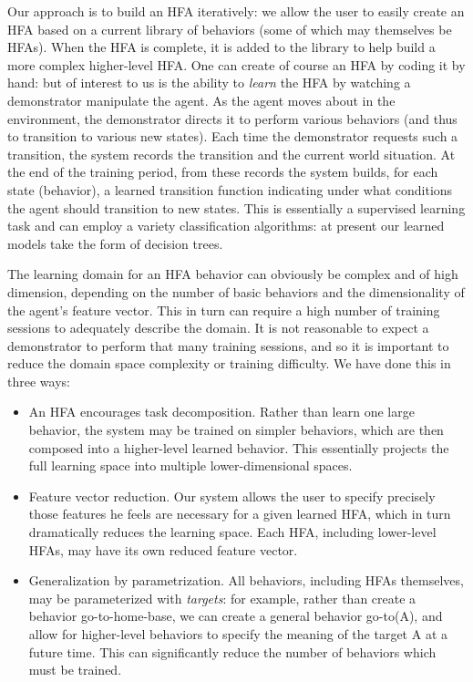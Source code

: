 \documentclass{aamas2010_cameraReady}
\begin{document}
Our approach is to build an HFA iteratively: we allow the user to easily create an HFA based on a current library of behaviors (some of which may themselves be HFAs).  When the HFA is complete, it is added to the library to help build a more complex higher-level HFA.   One can create of course an HFA by coding it by hand: but of interest to us is the ability to {\it learn} the HFA by watching a demonstrator manipulate the agent.  As the agent moves about in the environment, the demonstrator directs it to perform various behaviors (and thus to transition to various new states). Each time the demonstrator requests such a transition, the system records the transition and the current world situation.
At the end of the training period, from these records the system builds, for each state (behavior), a learned transition function indicating under what conditions the agent should transition to new states.  This is essentially a supervised learning task and can employ a variety classification algorithms: at present our learned models take the form of decision trees.

The learning domain for an HFA behavior can obviously be complex and of high dimension, depending on the number of basic behaviors and the dimensionality of the agent's feature vector.  This in turn can require a high number of training sessions to adequately describe the domain.  It is not reasonable to expect a demonstrator to perform that many training sessions, and so it is important to reduce the domain space complexity or training difficulty.  We have done this in three ways:

\begin{itemize}
\item An HFA encourages task decomposition.  Rather than learn one large behavior, the system may be trained on simpler behaviors, which are then composed into a higher-level learned behavior.  This essentially projects the full learning space into multiple lower-dimensional spaces.

\item Feature vector reduction.  Our system allows the user to specify precisely those features he feels are necessary for a given learned HFA, which in turn dramatically reduces the learning space.  Each HFA, including lower-level HFAs, may have its own reduced feature vector.

\item Generalization by parametrization.  All behaviors, including HFAs themselves, may be parameterized with {\it targets}: for example, rather than create a behavior \textsf{go-to-home-base}, we can create a general behavior \textsf{go-to(A)}, and allow for higher-level behaviors to specify the meaning of the target \textsf{A} at a future time.  This can significantly reduce the number of behaviors which must be trained.
\end{itemize}
\end{document}
